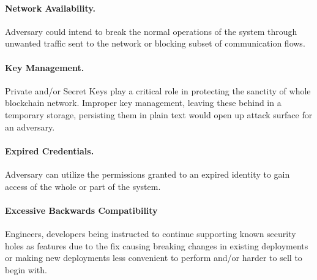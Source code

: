 \paragraph{Network Availability.}  Adversary could intend to break the normal operations of the system through unwanted traffic sent to the network or blocking subset of communication flows.

\paragraph{Key Management.}  Private and/or Secret Keys play a critical role in protecting the sanctity of whole blockchain network. Improper key management, leaving these behind in a temporary storage, persisting them in plain text would open up attack surface for an adversary.

\paragraph{Expired Credentials.}  Adversary can utilize the permissions granted to an expired identity to gain access of the whole or part of the system.

\paragraph{Excessive Backwards Compatibility}  Engineers, developers being instructed to continue supporting known security holes as features due to the fix causing breaking changes in existing deployments or making new deployments less convenient to perform and/or harder to sell to begin with.
